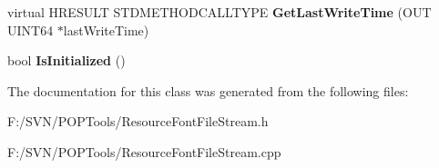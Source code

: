 \begin{DoxyCompactItemize}
\item 
\hypertarget{class_resource_font_file_stream_a6f3a70a76e5bf12030e2dcaf0fdb037c}{virtual H\-R\-E\-S\-U\-L\-T S\-T\-D\-M\-E\-T\-H\-O\-D\-C\-A\-L\-L\-T\-Y\-P\-E {\bfseries Get\-Last\-Write\-Time} (O\-U\-T U\-I\-N\-T64 $\ast$last\-Write\-Time)}\label{class_resource_font_file_stream_a6f3a70a76e5bf12030e2dcaf0fdb037c}

\item 
\hypertarget{class_resource_font_file_stream_a730e4d5e33625e016f5ae57b3ca6553d}{bool {\bfseries Is\-Initialized} ()}\label{class_resource_font_file_stream_a730e4d5e33625e016f5ae57b3ca6553d}

\end{DoxyCompactItemize}


The documentation for this class was generated from the following files\-:\begin{DoxyCompactItemize}
\item 
F\-:/\-S\-V\-N/\-P\-O\-P\-Tools/Resource\-Font\-File\-Stream.\-h\item 
F\-:/\-S\-V\-N/\-P\-O\-P\-Tools/Resource\-Font\-File\-Stream.\-cpp\end{DoxyCompactItemize}
